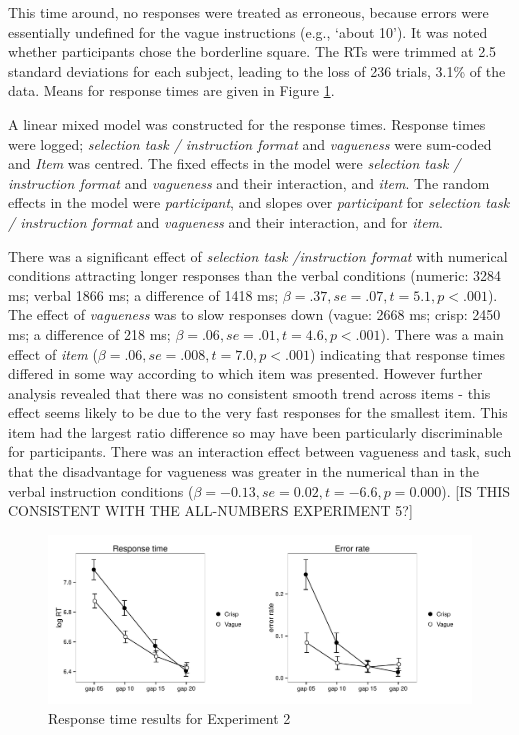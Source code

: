 \documentclass[graybox,envcountchap,sectrefs%
,footinfo
]{svmono}
\begin{document}
This time around, no responses were treated as erroneous, because errors were essentially undefined for the vague instructions (e.g., `about 10'). It was noted whether participants chose the borderline square. 
%
The RTs were trimmed at 2.5 standard deviations for each subject, leading to the loss of 236 trials, 3.1\% of the data. Means for response times are given in Figure  \ref{resultse2}.

A linear mixed model was constructed for the response times.
%
Response times were logged; \emph{selection task / instruction format} and \emph{vagueness} were sum-coded and \emph{Item} was centred. 
% 
The fixed effects in the model were \emph{selection task / instruction format} and \emph{vagueness} and their interaction, and \emph{item}.
% 
The random effects in the model were \emph{participant}, and slopes over \emph{participant} for \emph{selection task / instruction format} and \emph{vagueness} and their interaction, and for \emph{item}.

There was a significant effect of \emph{selection task /instruction format} with numerical conditions attracting longer responses than the verbal conditions (numeric: 3284 ms; verbal 1866 ms; a difference of 1418 ms; $\beta=.37, se=.07, t=5.1, p<.001$). 
% 
The effect of \emph{vagueness} was to slow responses down (vague: 2668 ms; crisp: 2450 ms; a difference of 218 ms; $\beta=.06, se=.01, t=4.6, p<.001$). 
%
There was a main effect of \emph{item} ($\beta=.06, se=.008, t=7.0, p<.001$) indicating that response times differed in some way according to which item was presented. However further analysis revealed that there was no consistent smooth trend across items - this effect seems likely to be due to the very fast responses for the smallest item. This item had the largest ratio difference so may have been particularly discriminable for participants. %
%
There was an interaction effect between vagueness and task, such that the disadvantage for vagueness was greater in the numerical than in the verbal instruction conditions ($\beta=-0.13, se= 0.02, t= -6.6, p=0.000$).  [IS THIS CONSISTENT WITH THE ALL-NUMBERS EXPERIMENT 5?]

\begin{figure}[b]
\sidecaption
\includegraphics[scale=.5]{images/resultse1}
\caption{Response time results for Experiment 2}
\label{resultse2}
\end{figure}
\end{document}
